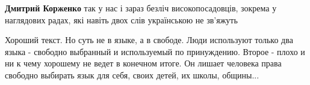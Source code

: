 \begin{itemize}
\begin{itemize}
 
\textbf{Дмитрий Корженко} так у нас і зараз безліч високопосадовців, зокрема у
наглядових радах, які навіть двох слів українською не зв’яжуть
\end{itemize}

\par
 

Хороший текст. Но суть не в языке, а в свободе. Люди используют только два
языка - свободно выбранный и используемый по принуждению. Второе - плохо и ни к
чему хорошему не ведет в конечном итоге. Он лишает человека права свободно
выбирать язык для себя, своих детей, их школы, общины...
\end{itemize}

